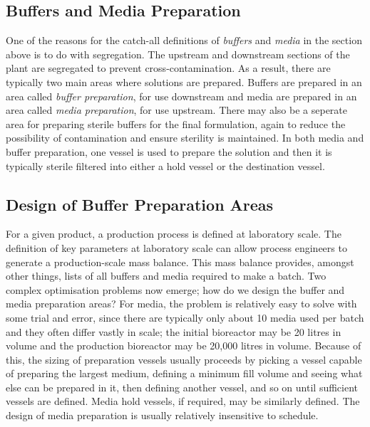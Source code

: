 \subsection{Buffers and Media Preparation}\label{SS.buffmedprep}

One of the reasons for the catch-all definitions of \emph{buffers} and
\emph{media} in the section above is to do with segregation.
The upstream and downstream sections of the plant are segregated to prevent
cross-contamination.
As a result, there are typically two main areas where solutions are prepared.
Buffers are prepared in an area called \emph{buffer preparation}, for use
downstream and media are prepared in an area called \emph{media preparation},
for use upstream.
There may also be a seperate area for preparing sterile buffers for the final
formulation, again to reduce the possibility of contamination and ensure
sterility is maintained.
In both media and buffer preparation, one vessel is used to prepare the solution
and then it is typically sterile filtered into either a hold vessel or the
destination vessel.

\subsection{Design of Buffer Preparation Areas}\label{SS.buffprepdes}

For a given product, a production process is defined at laboratory scale.  The
definition of key parameters at laboratory scale can allow process engineers to
generate a production-scale mass balance.  This mass balance provides, amongst
other things, lists of all buffers and media required to make a batch.  Two
complex optimisation problems now emerge; how do we design the buffer and media
preparation areas?  For media, the problem is relatively easy to solve with some
trial and error, since there are typically only about 10 media used per batch
and they often differ vastly in scale; the initial bioreactor may be 20 litres
in volume and the production bioreactor may be 20,000 litres in volume.  Because
of this, the sizing of preparation vessels usually proceeds by picking a vessel
capable of preparing the largest medium, defining a minimum fill volume and
seeing what else can be prepared in it, then defining another vessel, and so on
until sufficient vessels are defined.  Media hold vessels, if required, may be 
similarly defined.  The design of media preparation is usually relatively
insensitive to schedule.

